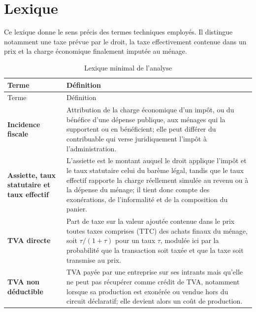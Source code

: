 \documentclass[11pt,a4paper]{article}
\begin{document}
\clearpage
\appendix

\section{Lexique}
\label{annexe:lexique}

Ce lexique donne le sens précis des termes techniques employés. Il distingue
notamment une taxe prévue par le droit, la taxe effectivement contenue dans un
prix et la charge économique finalement imputée au ménage.

\begin{longtable}{>{\RaggedRight\arraybackslash}p{}
                  >{\RaggedRight\arraybackslash}p{}}
\caption{Lexique minimal de l'analyse}\label{tab:lexique}\\
\toprule
Terme & Définition \\
\midrule
\endfirsthead
\toprule
Terme & Définition \\
\midrule
\endhead
\bottomrule
\endfoot

\textbf{Incidence fiscale}
& Attribution de la charge économique d'un impôt, ou du bénéfice d'une dépense
publique, aux ménages qui la supportent ou en bénéficient; elle peut différer du
contribuable qui verse juridiquement l'impôt à l'administration. \\[0.35em]

\textbf{Assiette, taux statutaire et taux effectif}
& L'assiette est le montant auquel le droit applique l'impôt et le taux
statutaire celui du barème légal, tandis que le taux effectif rapporte la charge
réellement simulée au revenu ou à la dépense du ménage; il tient donc compte des
exonérations, de l'informalité et de la composition du panier. \\[0.35em]

\textbf{TVA directe}
& Part de taxe sur la valeur ajoutée contenue dans le prix toutes taxes
comprises (TTC) des achats finaux du ménage, soit $\tau/(1+\tau)$ pour un taux
$\tau$, modulée ici par la probabilité que la transaction soit taxée et que la
taxe soit transmise au prix. \\[0.35em]

\textbf{TVA non déductible}
& TVA payée par une entreprise sur ses intrants mais qu'elle ne peut pas
récupérer comme crédit de TVA, notamment lorsque sa production est exonérée ou
vendue hors du circuit déclaratif; elle devient alors un coût de production. \\[0.35em]


\end{longtable}
\end{document}
